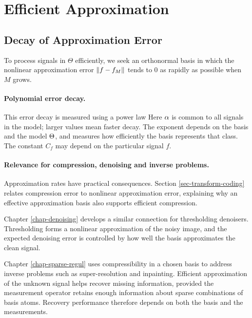 \section{Efficient Approximation}

\subsection{Decay of Approximation Error}
\label{sec-linear-approx-error}

To process signals in $\Theta$ efficiently, we seek an orthonormal basis in which the nonlinear approximation error $\lVert f-f_M\rVert$ tends to $0$ as rapidly as possible when $M$ grows.


\paragraph{Polynomial error decay.}

This error decay is measured using a power law
Here $\alpha$ is common to all signals in the model; larger values mean faster decay. The exponent depends on the basis and the model $\Theta$, and measures how efficiently the basis represents that class. The constant $C_f$ may depend on the particular signal $f$.

\paragraph{Relevance for compression, denoising and inverse problems.}

Approximation rates have practical consequences. Section \ref{sec-transform-coding} relates compression error to nonlinear approximation error, explaining why an effective approximation basis also supports efficient compression.

Chapter \ref{chap-denoising} develops a similar connection for thresholding denoisers. Thresholding forms a nonlinear approximation of the noisy image, and the expected denoising error is controlled by how well the basis approximates the clean signal.

Chapter \ref{chap-sparse-regul} uses compressibility in a chosen basis to address inverse problems such as super-resolution and inpainting. Efficient approximation of the unknown signal helps recover missing information, provided the measurement operator retains enough information about sparse combinations of basis atoms. Recovery performance therefore depends on both the basis and the measurements.



